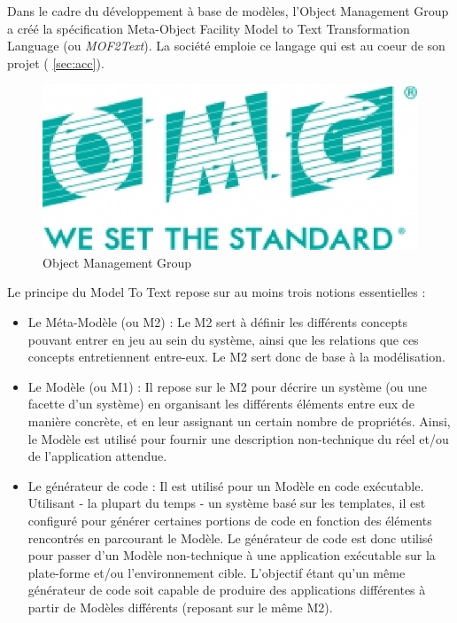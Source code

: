 Dans le cadre du développement à base de modèles, l'Object Management Group \cite{omg} a créé la spécification Meta-Object Facility Model to Text Transformation Language (ou \textit{MOF2Text}). La société \kwobeo{} emploie ce langage qui est au coeur de son projet \kwacceleo{} (\cf{} \ref{sec:acc}).

\begin{figure}[htb]
  \centering
  \includegraphics[scale=.6]{img/omg.eps}
  \caption{Object Management Group}
  \label{fig:omg}
\end{figure}


Le principe du Model To Text repose sur au moins trois notions essentielles :
\begin{itemize}
\item Le Méta-Modèle (ou M2) : Le M2 sert à définir les différents concepts pouvant entrer en jeu au sein du système, ainsi que les relations que ces concepts entretiennent entre-eux. Le M2 sert donc de base à la modélisation.
\item Le Modèle (ou M1) : Il repose sur le M2 pour décrire un système (ou une facette d'un système) en organisant les différents éléments entre eux de manière concrète, et en leur assignant un certain nombre de propriétés. Ainsi, le Modèle est utilisé pour fournir une description non-technique du réel et/ou de l'application attendue.
\item Le générateur de code : Il est utilisé pour  un Modèle en code exécutable. Utilisant - la plupart du temps - un système basé sur les templates, il est configuré pour générer certaines portions de code en fonction des éléments rencontrés en parcourant le Modèle. Le générateur de code est donc utilisé pour passer d'un Modèle non-technique à une application exécutable sur la plate-forme et/ou l'environnement cible. L'objectif étant qu'un même générateur de code soit capable de produire des applications différentes à partir de Modèles différents (reposant sur le même M2).\\
\end{itemize}

